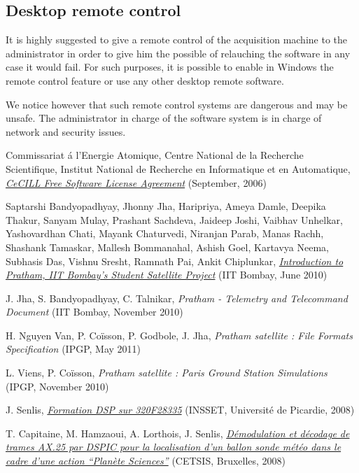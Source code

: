 \documentclass[a4paper]{report}
\begin{document}
\subsection{Desktop remote control}

It is highly suggested to give a remote control of the acquisition machine to the administrator in order to give him the possible of relauching the software in any case it would fail. For such purposes, it is possible to enable in Windows the remote control feature or use any other desktop remote software.

We notice however that such remote control systems are dangerous and may be unsafe. The administrator in charge of the software system is in charge of network and security issues.


\begin{thebibliography}{99}

Commissariat \'a l'Energie Atomique, Centre National de la Recherche Scientifique, Institut National de Recherche en Informatique et en Automatique, {\it \href{http://www.cecill.info/licences/Licence_CeCILL_V2-en.html}{CeCILL Free Software License Agreement}} (September, 2006)

Saptarshi Bandyopadhyay, Jhonny Jha, Haripriya, Ameya Damle, Deepika Thakur, Sanyam Mulay, Prashant Sachdeva, Jaideep Joshi, Vaibhav Unhelkar, Yashovardhan Chati, Mayank Chaturvedi, Niranjan Parab, Manas Rachh, Shashank Tamaskar, Mallesh Bommanahal, Ashish Goel, Kartavya Neema, Subhasis Das, Vishnu Sresht, Ramnath Pai, Ankit Chiplunkar, {\it \href{http://www.aero.iitb.ac.in/pratham/otherdocs/IIT-B_Paper_Pratham_20thApr.pdf}{Introduction to Pratham, IIT Bombay’s Student Satellite Project}} (IIT Bombay, June 2010)

J. Jha, S. Bandyopadhyay, C. Talnikar, {\it Pratham - Telemetry and Telecommand Document} (IIT Bombay, November 2010)

H. Nguyen Van, P. Co\"isson, P. Godbole, J. Jha, {\it Pratham satellite : File Formats Specification} (IPGP, May 2011)

L. Viens, P. Co\"isson, {\it Pratham satellite : Paris Ground Station Simulations} (IPGP, November 2010)

J. Senlis, {\it \href{http://jgsenlis.free.fr/dsp_28335.htm}{Formation DSP sur 320F28335}} (INSSET, Universit\'e de Picardie, 2008)

T. Capitaine, M. Hamzaoui, A. Lorthois, J. Senlis, {\it \href{http://jgsenlis.free.fr/ax25/Cetsis2008_AX25.pdf}{D\'emodulation et d\'ecodage de trames AX.25 par DSPIC pour la localisation d'un ballon sonde m\'et\'eo dans le cadre d'une action ``Plan\`ete Sciences''}} (CETSIS, Bruxelles, 2008)


\end{thebibliography}
\end{document}
